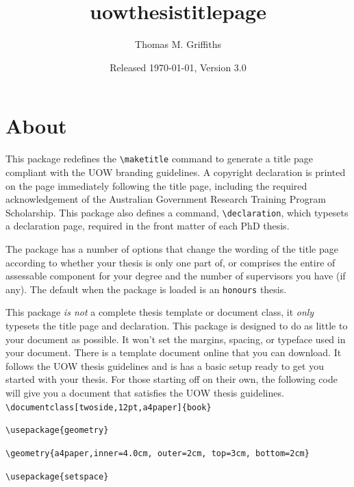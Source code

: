 \documentclass[12pt,oneside]{article}
\newcommand{\option}[1]{\texttt{\color{UOWblue}#1}}
\newcommand{\command}[1]{\texttt{\color{UOWred}#1}}
\newcommand{\comoptions}[1]{\texttt{\color{UOWdarkblue}#1}}
\begin{document}
    
\title{\textsf{uowthesistitlepage}}
\author{\small Thomas M. Griffiths}
\date{Released \today, Version 3.0}

\maketitle

\tableofcontents

\section{About}
This package redefines the \command{\textbackslash{}maketitle} command to generate a title page compliant with the UOW branding guidelines. A copyright declaration is printed on the page immediately following the title page, including the required acknowledgement of the Australian Government Research Training Program Scholarship. This package also defines a command, \command{\textbackslash{}declaration}, which typesets a declaration page, required in the front matter of each PhD thesis. 

The package has a number of options that change the wording of the title page according to whether your thesis is only one part of, or comprises the entire of assessable component for your degree and the number of supervisors you have (if any). The default when the package is loaded is an \option{honours} thesis.

This package \emph{is not} a complete thesis template or document class, it \emph{only} typesets the title page and declaration. This package is designed to do as little to your document as possible. It won't set the margins, spacing, or typeface used in your document. There is a template document online that you can download. It follows the UOW thesis guidelines and is has a basic setup ready to get you started with your thesis. For those starting off on their own, the following code will give you a document that satisfies the UOW thesis guidelines.\\

\command{\textbackslash{}documentclass}\option{[twoside,12pt,a4paper]}\comoptions{\{book\}}

\command{\textbackslash{}usepackage}\comoptions{\{geometry\}}

\command{\textbackslash{}geometry}\comoptions{\{a4paper,inner=4.0cm, outer=2cm, top=3cm, bottom=2cm\}}

\command{\textbackslash{}usepackage}\comoptions{\{setspace\}}
\end{document}
